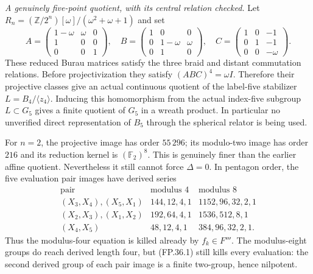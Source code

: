 \emph{A genuinely five-point quotient, with its central relation checked.}
Let $R_n=(\mathbb Z/2^n)[\omega]/(\omega^2+\omega+1)$ and set
\[
 A=\begin{pmatrix}1-\omega&\omega&0\\1&0&0\\0&0&1\end{pmatrix},
 \quad B=\begin{pmatrix}1&0&0\\0&1-\omega&\omega\\0&1&0\end{pmatrix},
 \quad C=\begin{pmatrix}1&0&-1\\0&1&-1\\0&0&-\omega\end{pmatrix}.
 \tag{FP.36.2}
\]
These reduced Burau matrices satisfy the three braid and distant
commutation relations. Before projectivization they satisfy
$(ABC)^4=\omega I$. Therefore their projective classes give an
actual continuous quotient of the label-five stabilizer
$L=B_4/\langle z_4\rangle$.
Inducing this homomorphism from the actual index-five subgroup
$L\subset G_5$ gives a finite quotient of $G_5$ in a wreath
product. In particular no unverified direct representation of
$B_5$ through the spherical relator is being used.

For $n=2$, the projective image has order $55\,296$; its
modulo-two image has order $216$ and its reduction kernel is
$(\mathbb F_2)^8$. This is genuinely finer than the earlier
affine quotient. Nevertheless it still cannot force $\Delta=0$.
In pentagon order, the five evaluation pair images have derived
series
\[
\begin{array}{c|c|c}
 \text{pair}&\text{modulus }4&\text{modulus }8\\ \hline
 (X_3,X_4),(X_5,X_1)&144,12,4,1&1152,96,32,2,1\\
 (X_2,X_3),(X_1,X_2)&192,64,4,1&1536,512,8,1\\
 (X_4,X_5)&48,12,4,1&384,96,32,2,1 .
\end{array}
 \tag{FP.36.3}
\]
Thus the modulus-four equation is killed already by
$f_k\in F'''$. The modulus-eight groups do reach derived length
four, but (FP.36.1) still kills every evaluation: the second
derived group of each pair image is a finite two-group, hence
nilpotent.

